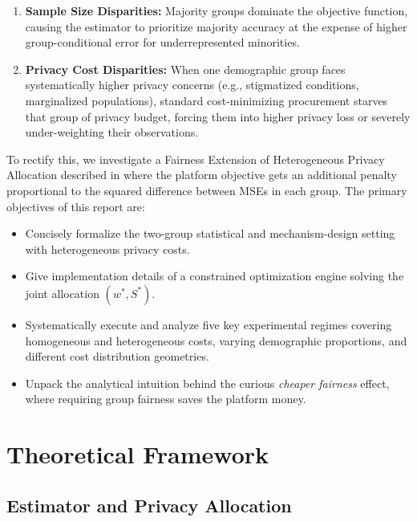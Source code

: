 \documentclass[11pt,a4paper]{article}
\begin{document}
\begin{enumerate}
    \item \textbf{Sample Size Disparities:} Majority groups dominate the objective function, causing the estimator to prioritize majority accuracy at the expense of higher group-conditional error for underrepresented minorities.
    \item \textbf{Privacy Cost Disparities:} When one demographic group faces systematically higher privacy concerns (e.g., stigmatized conditions, marginalized populations), standard cost-minimizing procurement starves that group of privacy budget, forcing them into higher privacy loss or severely under-weighting their observations.
\end{enumerate}

To rectify this, we investigate a Fairness Extension of Heterogeneous Privacy Allocation described in \cite{fallah2023optimal} where the platform objective gets an additional penalty proportional to the squared difference between MSEs in each group. The primary objectives of this report are:
\begin{itemize}[leftmargin=1.5em]
    \item Concisely formalize the two-group statistical and mechanism-design setting with heterogeneous privacy costs.
    \item Give implementation details of a constrained optimization engine solving the joint allocation $(w^*, S^*)$.
    \item Systematically execute and analyze five key experimental regimes covering homogeneous and heterogeneous costs, varying demographic proportions, and different cost distribution geometries.
    \item Unpack the analytical intuition behind the curious \emph{cheaper fairness} effect, where requiring group fairness saves the platform money.
\end{itemize} 

\section{Theoretical Framework}

\subsection{Estimator and Privacy Allocation}
\end{document}
